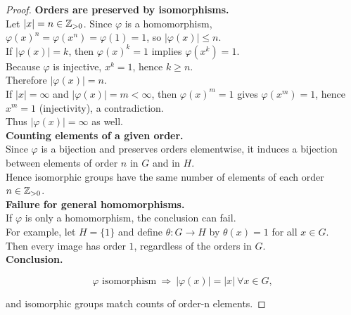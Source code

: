 \documentclass[12pt]{article}
\theoremstyle{definition}
\begin{document}
\dotfill

\begin{proof}
\noindent\textbf{Orders are preserved by isomorphisms.}\\

\noindent Let $|x|=n\in\Bbb Z_{>0}$. Since $\varphi$ is a homomorphism, \\

\noindent $\varphi(x)^n=\varphi(x^n)=\varphi(1)=1$, so $|\varphi(x)|\le n$.\\

\noindent If $|\varphi(x)|=k$, then $\varphi(x)^k=1$ implies $\varphi(x^k)=1$.\\

\noindent Because $\varphi$ is injective, $x^k=1$, hence $k\ge n$.\\

\noindent Therefore $|\varphi(x)|=n$.\\

\noindent If $|x|=\infty$ and $|\varphi(x)|=m<\infty$, then $\varphi(x)^m=1$ gives $\varphi(x^m)=1$, hence $x^m=1$ (injectivity), a contradiction.\\

\noindent Thus $|\varphi(x)|=\infty$ as well.\\

\noindent\textbf{Counting elements of a given order.}\\

\noindent Since $\varphi$ is a bijection and preserves orders elementwise, it induces a bijection between elements of order $n$ in $G$ and in $H$. \\

\noindent Hence isomorphic groups have the same number of elements of each order $n\in\Bbb Z_{>0}$.\\

\noindent\textbf{Failure for general homomorphisms.}\\

\noindent If $\varphi$ is only a homomorphism, the conclusion can fail. \\

\noindent For example, let $H=\{1\}$ and define $\theta:G\to H$ by $\theta(x)=1$ for all $x\in G$. \\

\noindent Then every image has order $1$, regardless of the orders in $G$.\\

\noindent\textbf{Conclusion.}

\[
\boxed{\ \varphi\text{ isomorphism}\ \Longrightarrow\ |\varphi(x)|=|x|\ \forall x\in G,\ }
\]

and isomorphic groups match counts of order-n elements. 

\end{proof}
\end{document}
